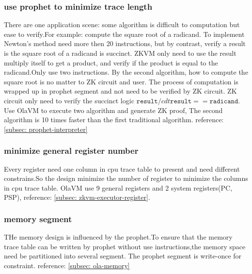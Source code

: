 \subsubsection{use prophet to minimize trace length}
There are one application scene: some algorithm is difficult to computation but ease to verify.For example: compute the square root of a radicand.
To implement Newton's method  need more then 20 instructions, but by contrast, verify a result is the square root of a radicand is succinct.
ZKVM only need to use the result multiply itself to get a product, and verify if the product is equal to the radicand.Only use two instructions.
By the second algorithm, how to compute the square root is no matter to ZK circuit and user.
The process of computation is wrapped up in prophet segment and not need to be verified by ZK circuit.
ZK circuit only need to verify the succinct logic $\texttt{result} /cdt \texttt{result} == \texttt{radicand}$.
Use OlaVM to execute two algorithm and generate ZK proof, The second algorithm is 10 times faster than the first traditional algorithm.
reference: \ref{subsec: prophet-interpreter}

\subsubsection{minimize general register number}
Every register need one column in cpu trace table to present and need different constrains.So the design minimize the number of register to minimize the columns in cpu trace table.
OlaVM use 9 general registers and 2 system registers(PC, PSP),  reference: \ref{subsec: zkvm-executor-register}.

\subsubsection{memory segment}
THe memory design is influenced by the prophet.To ensure that the memory trace table can be written by prophet without use instructions,the memory space need be partitioned into several segment.
The prophet segment is write-once for constraint. reference: \ref{subsec: ola-memory}